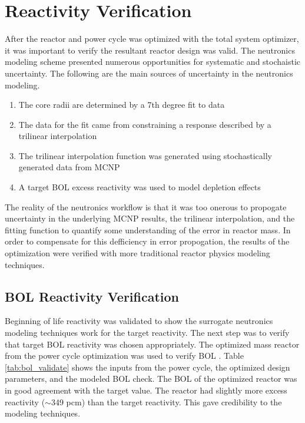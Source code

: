 \section{Reactivity Verification}
After the reactor and power cycle was optimized with the total system optimizer,
it was important to verify the resultant reactor design was valid. The
neutronics modeling scheme presented numerous opportunities for systematic and
stochaistic uncertainty. The following are the main sources
of uncertainty in the neutronics modeling.

\onehalfspacing
\begin{enumerate}
    \item The core radii are determined by a 7th degree fit to data
    \item The data for the fit came from constraining a \keff response described
        by a trilinear interpolation
    \item The trilinear interpolation function was generated using stochastically
        generated \keff data from MCNP
    \item A target BOL excess reactivity was used to model depletion effects
\end{enumerate}
\doublespacing

The reality of the neutronics workflow is that it was too onerous to propogate
uncertainty in the underlying MCNP results, the trilinear interpolation, and the
fitting function to quantify some understanding of the error in reactor mass. In
order to compensate for this defficiency in error propogation, the results of
the optimization were verified with more traditional reactor physics modeling
techniques.

\subsection{BOL Reactivity Verification}
Beginning of life reactivity was validated to show the surrogate neutronics
modeling techniques work for the target reactivity. The next step was to verify
that target BOL reactivity was chosen appropriately. The optimized mass reactor
from the power cycle optimization was used to verify BOL \keff. Table
\ref{tab:bol_validate} shows the inputs from the power cycle, the optimized
design parameters, and the modeled BOL \keff check. The BOL \keff of the optimized reactor
was in good agreement with the target value. 
The reactor had slightly more excess reactivity ($\sim$349 pcm) than the
target reactivity. This gave credibility to the \keff modeling techniques.

